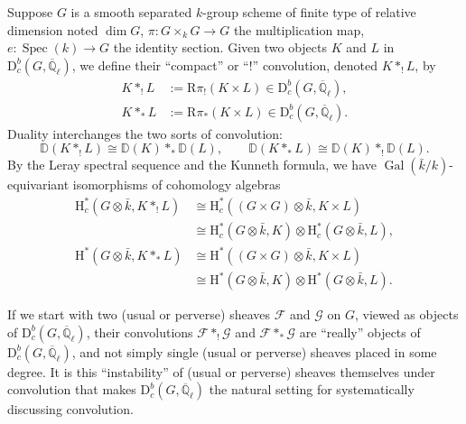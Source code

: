 Suppose \(G\) is a smooth separated \(k\)-group scheme of finite type of
relative dimension noted \(\dim G\), \(\pi:G\times_kG\to G\) the
multiplication map, \(e:\operatorname{Spec}(k)\to G\) the identity section.
Given two objects \(K\) and \(L\) in
\(\mathrm{D}^b_c(G,\overline{\mathbb{Q}}_\ell)\), we define their ``compact''
or ``!'' convolution, denoted \(K*_!L\), by
\[
\begin{aligned}
  K*_!L&:=\mathrm{R}\pi_!(K\times L)\in
  \mathrm{D}^b_c(G,\overline{\mathbb{Q}}_\ell),\\
  K*_*L&:=\mathrm{R}\pi_*(K\times L)\in
  \mathrm{D}^b_c(G,\overline{\mathbb{Q}}_\ell).
\end{aligned}
\]
Duality interchanges the two sorts of convolution:
\[
  \mathbb{D}(K*_!L)\cong\mathbb{D}(K)*_*\mathbb{D}(L),\qquad
  \mathbb{D}(K*_*L)\cong\mathbb{D}(K)*_!\mathbb{D}(L).
\]
By the Leray spectral sequence and the Kunneth formula, we have
\(\operatorname{Gal}(\bar{k}/k)\)-equivariant isomorphisms of cohomology
algebras
\[
\begin{aligned}
  \mathrm{H}^*_c(G\otimes\bar{k},K*_!L)
  &\cong
  \mathrm{H}^*_c((G\times G)\otimes\bar{k},K\times L)\\
  &\cong
  \mathrm{H}^*_c(G\otimes\bar{k},K)\otimes
  \mathrm{H}^*_c(G\otimes\bar{k},L),\\
  \mathrm{H}^*(G\otimes\bar{k},K*_*L)
  &\cong
  \mathrm{H}^*((G\times G)\otimes\bar{k},K\times L)\\
  &\cong
  \mathrm{H}^*(G\otimes\bar{k},K)\otimes
  \mathrm{H}^*(G\otimes\bar{k},L).
\end{aligned}
\]

If we start with two (usual or perverse) sheaves \(\mathcal{F}\) and
\(\mathcal{G}\) on \(G\), viewed as objects of
\(\mathrm{D}^b_c(G,\overline{\mathbb{Q}}_\ell)\), their convolutions
\(\mathcal{F}*_!\mathcal{G}\) and \(\mathcal{F}*_*\mathcal{G}\) are
``really'' objects of \(\mathrm{D}^b_c(G,\overline{\mathbb{Q}}_\ell)\), and
not simply single (usual or perverse) sheaves placed in some degree. It is this
``instability'' of (usual or perverse) sheaves themselves under convolution
that makes \(\mathrm{D}^b_c(G,\overline{\mathbb{Q}}_\ell)\) the natural
setting for systematically discussing convolution.

